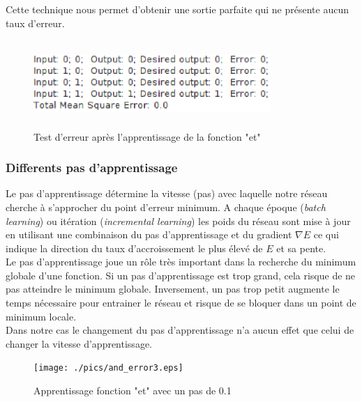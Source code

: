 \documentclass[twoside,openright,a4paper,11pt,french]{article}
\begin{document}
Cette technique nous permet d'obtenir une sortie parfaite qui ne présente
aucun taux d'erreur.



\begin{figure}[ht]
\centering
\includegraphics[width=9cm,height=3.3cm]{./pics/andtest2.eps}
\caption{Test d'erreur après l'apprentissage de la fonction "et"}
\label{fig:andtest2}
\end{figure}


\subsubsection{Differents pas d'apprentissage}

Le pas d'apprentissage détermine la vitesse (pas) avec laquelle notre réseau
cherche à s'approcher du point d'erreur minimum. 
A chaque époque ({\it batch learning}) ou itération ({\it incremental
learning}) les poids du réseau sont mise à jour en utilisant une combinaison du
pas d'apprentissage et du gradient $\nabla E$ ce qui indique la direction du taux
d'accroissement le plus élevé de $E$ et sa pente.\\

Le pas d'apprentissage joue un rôle très important dans la recherche du
minimum globale d'une fonction. 
Si un pas d'apprentissage est trop grand, cela risque de ne pas atteindre le minimum globale.
Inversement, un pas trop petit augmente le temps nécessaire pour entrainer le réseau et risque de
se bloquer dans un point de minimum locale.\\

Dans notre cas le changement du pas d'apprentissage n'a aucun effet que celui 
de changer la vitesse d'apprentissage.


\begin{figure}[ht]
\centering
\texttt{[image: ./pics/and\_error3.eps]}
\caption{Apprentissage fonction "et" avec un pas de 0.1}
\label{fig:anderr3}
\end{figure}
\end{document}
